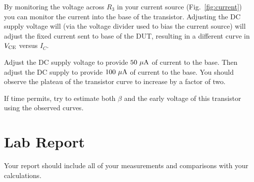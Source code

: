 \documentclass[12pt]{article}
\begin{document}
By monitoring the voltage across $R_3$ in your current source (Fig.~\ref{fig:current}) you can monitor the current into the base of the transistor.  Adjusting the DC supply voltage will (via the voltage divider used to bias the current source) will adjust the fixed current sent to base of the DUT, resulting in a different curve in $V_{\rm CE}$ versus $I_C$.

Adjust the DC supply voltage to provide $50~\rm \mu A$ of current to the base.  Then adjust the DC supply to provide $100~\rm \mu A$ of current to the base.  You should observe the plateau of the transistor curve to increase by a factor of two.

If time permits, try to estimate both $\beta$ and the early voltage of this transistor using the observed curves.

\section{Lab Report}

Your report should include all of your measurements and comparisons with your calculations.
 
\end{document}
